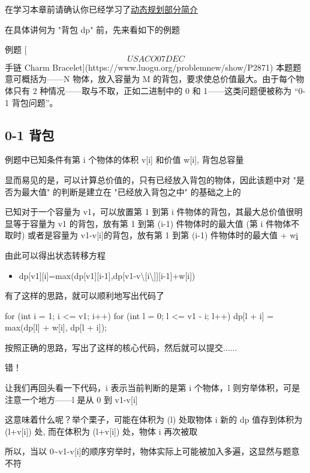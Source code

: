 
在学习本章前请确认你已经学习了\href{/dp/}{动态规划部分简介}

在具体讲何为 "背包 dp" 前，先来看如下的例题

\begin{NOTE}{ 例题 [\[USACO07DEC\] 手链 Charm Bracelet](https://www.luogu.org/problemnew/show/P2871)}{}
本题题意可概括为——N 物体，放入容量为 M 的背包，要求使总价值最大。由于每个物体只有 2 种情况——取与不取，正如二进制中的 0 和 1——这类问题便被称为 “0-1 背包问题”。
\end{NOTE}


\subsection{0-1 背包}

例题中已知条件有第 i 个物体的体积 v[i] 和价值 w[i], 背包总容量

显而易见的是，可以计算总价值的，只有已经放入背包的物体，因此该题中对 "是否为最大值" 的判断是建立在 "已经放入背包之中" 的基础之上的

已知对于一个容量为 v1，可以放置第 1 到第 i 件物体的背包，其最大总价值很明显等于容量为 v1 的背包，放有第 1 到第 (i-1) 件物体时的最大值 (第 i 件物体不取时) 或者是容量为 v1-v[i]的背包，放有第 1 到第 (i-1) 件物体时的最大值 + w\href{第i件物体取时}{i}

由此可以得出状态转移方程

\begin{itemize}
\item dp[v1][i]=max(dp[v1][i-1],dp[v1-v\textbackslash{}[i\textbackslash{}]][i-1]+w[i])
\end{itemize}

有了这样的思路，就可以顺利地写出代码了

\begin{cppcode}
for (int i = 1; i <= v1; i++)
  for (int l = 0; l <= v1 - i; l++) dp[l + i] = max(dp[l] + w[i], dp[l + i]);
\end{cppcode}

按照正确的思路，写出了这样的核心代码，然后就可以提交......

错！

让我们再回头看一下代码，i 表示当前判断的是第 i 个物体，l 则穷举体积，可是注意一个地方——l 是从 0 到 v1-v[i]

这意味着什么呢？举个栗子，可能在体积为 (l) 处取物体 i 新的 dp 值存到体积为 (l+v[i]) 处, 而在体积为 (l+v[i]) 处，物体 i 再次被取

所以，当以 0\textasciitilde{}v1-v[i]的顺序穷举时，物体实际上可能被加入多遍，这显然与题意不符


